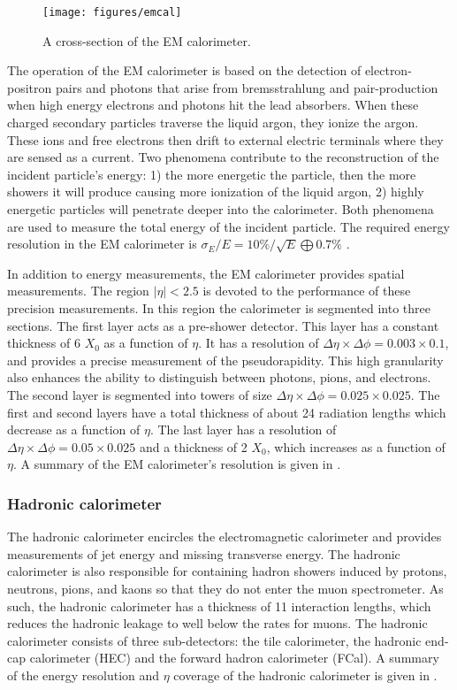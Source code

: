 \begin{figure}[!hbpt]
  \centering
  \texttt{[image: figures/emcal]}
  \caption{A cross-section of the EM calorimeter.}
  \label{fig:emcal}
\end{figure}

The operation of the EM calorimeter is based on the detection of electron-positron
pairs and photons that arise from bremsstrahlung and pair-production when high
energy electrons and photons hit the lead absorbers. When these charged
secondary particles traverse the liquid argon, they ionize the argon.
These ions and free electrons then drift to external electric terminals where
they are sensed as a current. Two phenomena contribute to the reconstruction
of the incident particle's energy: 1) the more energetic the particle, then
the more showers it will produce causing more ionization of the liquid argon,
2) highly energetic particles will penetrate deeper into the calorimeter.
Both phenomena are used to measure the total energy of the incident particle.
The required energy resolution in the EM calorimeter is 
$\sigma_E/E = 10\% / \sqrt{E} \bigoplus 0.7\%$ \cite{Lardesign}.

In addition to energy measurements, the EM calorimeter provides spatial
measurements. The region $|\eta| < 2.5$ is devoted to the 
performance of these precision measurements.
In this region the calorimeter is segmented into three sections. The first
layer acts as a pre-shower detector. This layer has a constant thickness of
6 $X_0$ as a function of $\eta$. It has a resolution of $\Delta\eta \times
\Delta\phi = 0.003 \times 0.1$, and provides a precise measurement of
the pseudorapidity. This high granularity also enhances the ability to distinguish
between photons, pions, and electrons. The second layer is segmented into towers
of size $\Delta \eta \times \Delta\phi = 0.025 \times 0.025$. The first
and second layers have a total thickness of about 24 radiation lengths which
decrease as a function of $\eta$. The last layer has a resolution of 
$\Delta\eta \times \Delta\phi = 0.05 \times 0.025$ and a thickness of
2 $X_0$, which increases as a function of $\eta$. A summary of the EM 
calorimeter's resolution is given in .

\subsubsection*{Hadronic calorimeter}
The hadronic calorimeter encircles the electromagnetic calorimeter and
provides measurements of jet energy and missing transverse energy. The hadronic
calorimeter is also responsible for containing hadron showers induced by
protons, neutrons, pions, and kaons so that they do not enter the muon spectrometer.
As such, the hadronic calorimeter has a thickness of 11 interaction
lengths, which reduces the hadronic leakage to well below the rates for muons.
The hadronic calorimeter consists of three sub-detectors: the tile 
calorimeter, the hadronic end-cap calorimeter (HEC) and the forward hadron
calorimeter (FCal). A summary of the energy resolution and $\eta$ coverage
of the hadronic calorimeter is given in .

